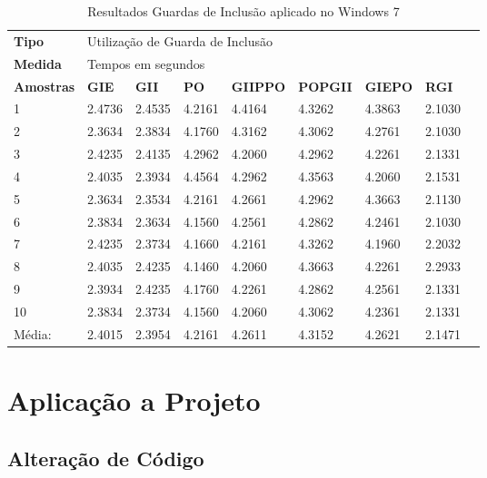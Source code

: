 \begin{table}[!ht]
\centering
\caption{Resultados Guardas de Inclusão aplicado no Windows 7}
\label{tab:resutados_guards_de_inclusao:windows7}
\begin{tiny}
\begin{tabular}{lp{1cm}p{1cm}p{1cm}p{1cm}p{1cm}p{1cm}p{1cm}p{1cm}}
\textbf{Tipo} & \multicolumn{7}{l}{Utilização de Guarda de Inclusão} \\
\textbf{Medida} & \multicolumn{7}{l}{Tempos em segundos } \\
\textbf{Amostras} & \textbf{GIE} & \textbf{GII} & \textbf{PO} & 
\textbf{GIIPPO} & \textbf{POPGII} & \textbf{GIEPO} & \textbf{RGI} \\ \toprule
 1      & 2.4736 & 2.4535 & 4.2161 & 4.4164 & 4.3262 & 4.3863  & 2.1030 \\ 
 2      & 2.3634 & 2.3834 & 4.1760 & 4.3162 & 4.3062 & 4.2761  & 2.1030 \\ 
 3      & 2.4235 & 2.4135 & 4.2962 & 4.2060 & 4.2962 & 4.2261  & 2.1331 \\ 
 4      & 2.4035 & 2.3934 & 4.4564 & 4.2962 & 4.3563 & 4.2060  & 2.1531 \\ 
 5      & 2.3634 & 2.3534 & 4.2161 & 4.2661 & 4.2962 & 4.3663  & 2.1130 \\ 
 6      & 2.3834 & 2.3634 & 4.1560 & 4.2561 & 4.2862 & 4.2461  & 2.1030 \\ 
 7      & 2.4235 & 2.3734 & 4.1660 & 4.2161 & 4.3262 & 4.1960  & 2.2032 \\ 
 8      & 2.4035 & 2.4235 & 4.1460 & 4.2060 & 4.3663 & 4.2261  & 2.2933 \\ 
 9      & 2.3934 & 2.4235 & 4.1760 & 4.2261 & 4.2862 & 4.2561  & 2.1331 \\ 
 10     & 2.3834 & 2.3734 & 4.1560 & 4.2060 & 4.3062 & 4.2361  & 2.1331 \\ \bottomrule 
 Média: & 2.4015 & 2.3954 & 4.2161 & 4.2611 & 4.3152 & 4.2621  & 2.1471 \\
\end{tabular}
\end{tiny}
\end{table}

\section{Aplicação a Projeto}

\subsection{Alteração de Código}\label{resultados_alteracao_de_codigo}

